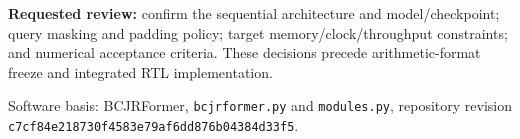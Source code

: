 \documentclass[11pt,a4paper]{article}
\begin{document}
\textbf{Requested review:} confirm the sequential architecture and model/checkpoint; query masking and padding policy; target memory/clock/throughput constraints; and numerical acceptance criteria. These decisions precede arithmetic-format freeze and integrated RTL implementation.

{\footnotesize Software basis: BCJRFormer, \texttt{bcjrformer.py} and \texttt{modules.py}, repository revision \texttt{c7cf84e218730f4583e79af6dd876b04384d33f5}.}
\end{document}
